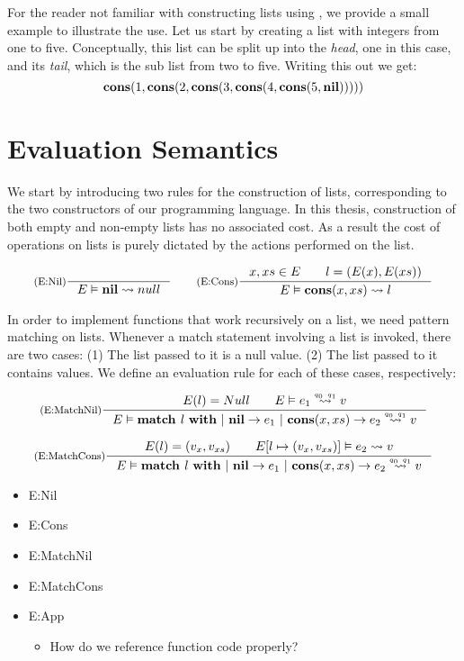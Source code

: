 For the reader not familiar with constructing lists using , we provide a small example to illustrate the use. Let us start by creating a list with integers from one to five. Conceptually, this list can be split up into the \emph{head}, one in this case, and its \emph{tail}, which is the sub list from two to five. Writing this out we get:
\[
   \textbf{cons}(1, \textbf{cons}(2, \textbf{cons}(3, \textbf{cons}(4, \textbf{cons}(5, \textbf{nil})))))
\]

\section{Evaluation Semantics}

We start by introducing two rules for the construction of lists, corresponding to the two constructors of our programming language. In this thesis, construction of both empty and non-empty lists has no associated cost. As a result the cost of operations on lists is purely dictated by the actions performed on the list. 

\[
   \inference[(E:Nil)]
   {}
   {\evals{E}{\listnil}{null}{}{}}
   \qquad
   \inference[(E:Cons)]
   {\contains{E}{x, xs} \qquad l = (E(x), E(xs))}
   {\evals{E}{\cons{x}{xs}}{l}{}{}}
\]

In order to implement functions that work recursively on a list, we need pattern matching on lists. Whenever a match statement involving a list is invoked, there are two cases: (1) The list passed to it is a null value. (2) The list passed to it contains values. We define an evaluation rule for each of these cases, respectively:

\[
   \inference[(E:MatchNil)]
   {E(l) = Null \qquad \evals{E}{e_1}{v}{q_0}{q_1}}
   {\evals{E}{\listmatch{l}{e_1}{e_2}}{v}{q_0}{q_1}}
\]

\[
   \inference[(E:MatchCons)]
   {E(l) = (v_x, v_{xs}) \qquad \evals{\envaugment{E}{l}{(v_x, v_{xs})}}{e_2}{v}{}{}}
   {\evals{E}{\listmatch{l}{e_1}{e_2}}{v}{q_0}{q_1}}
\]




\begin{itemize}
   \item E:Nil
   \item E:Cons
   \item E:MatchNil
   \item E:MatchCons
   \item E:App
      \begin{itemize}
         \item How do we reference function code properly?
      \end{itemize}
\end{itemize}

